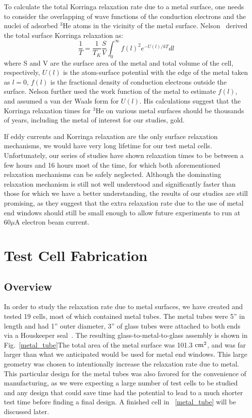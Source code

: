 To calculate the total Korringa relaxation rate due to a metal surface, one needs to consider the overlapping of wave functions of the conduction electrons and the nuclei of adsorbed $^{3}$He atoms in the vicinity of the metal surface. Nelson~\cite{NelsonThesis} derived the total surface Korringa relaxation as:
\begin{equation}
\frac{1}{T}=\frac{1}{T_K}\frac{S}{V}\int_{0}^{\infty} f\left(l\right)^2 e^{-U\left(l\right)/kT}dl
\end{equation}
where S and V are the surface area of the metal and total volume of the cell, respectively, $U\left(l\right)$ is the atom-surface potential with the edge of the metal taken as $l=0$, $f\left(l\right)$ is the fractional density of conduction electrons outside the surface. Nelson further used the work function of the metal to estimate $f\left(l\right)$, and assumed a van der Waals form for $U\left(l\right)$. His calculations suggest that the Korringa relaxation times for $^{3}$He on various metal surfaces should be thousands of years, including the metal of interest for our studies, gold.

If eddy currents and Korringa relaxation are the only surface relaxation mechanisms, we would have very long lifetime for our test metal cells. Unfortunately, our series of studies have shown relaxation times to be between a few hours and 16 hours most of the time, for which both aforementioned relaxation mechanisms can be safely neglected. Although the dominating relaxation mechanism is still not well understood and significantly faster than those for which we have a better understanding, the results of our studies are still promising, as they suggest that the extra relaxation rate due to the use of metal end windows should still be small enough to allow future experiments to run at 60$\mu$A electron beam current.

\section{Test Cell Fabrication}

\subsection{Overview}

In order to study the relaxation rate due to metal surfaces, we have created and tested 19 cells, most of which contained metal tubes. The metal tubes were 5'' in length and had 1'' outer diameter, 3'' of glass tubes were attached to both ends via a Houskeeper seal~\cite{Houskeeper}. The resulting glass-to-metal-to-glass assembly is shown in Fig.~\ref{metal_tube}The total area of the metal surface was 101.3 ${\rm cm^2}$, and was far larger than what we anticipated would be used for metal end windows. This large geometry was chosen to intentionally increase the relaxation rate due to metal. This particular design for the metal tubes was also favored for the convenience of manufacturing, as we were expecting a large number of test cells to be studied and any design that could save time had the potential to lead to a much shorter test time before finding a final design. A finished cell in ~\ref{metal_tube} will be discussed later.

